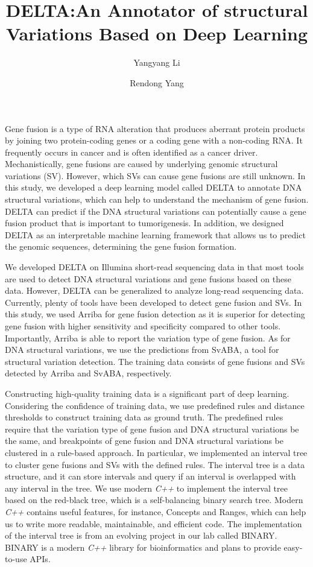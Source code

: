 \documentclass{article}
\title{DELTA:An Annotator of structural Variations Based on Deep Learning}
\author[1]{Yangyang Li}
\author[1]{Rendong Yang}
\affil[1]{\small Department of Urology, Northwestern University Feinberg School of Medicine, Chicago, IL 60611,
USA.}
\begin{document}
\maketitle



Gene fusion is a type of RNA alteration that produces aberrant protein products by joining two protein-coding genes or a coding gene with a non-coding RNA\@.
It frequently occurs in cancer and is often identified as a cancer driver.
Mechanistically, gene fusions are caused by underlying genomic structural variations (SV).
However, which SVs can cause gene fusions are still unknown.
In this study, we developed a deep learning model called DELTA to annotate DNA structural variations, which can help to understand the mechanism of gene fusion.
DELTA can predict if the DNA structural variations can potentially cause a gene fusion product that is important to tumorigenesis.
In addition, we designed DELTA as an interpretable machine learning framework that allows us to predict the genomic sequences, determining the gene fusion formation.


We developed DELTA on Illumina short-read sequencing data in that most tools are used to detect DNA structural variations and gene fusions based on these data.
However, DELTA can be generalized to analyze long-read sequencing data.
Currently, plenty of tools have been developed to detect gene fusion and SVs.
In this study, we used Arriba for gene fusion detection as it is superior for detecting gene fusion with higher sensitivity and specificity compared to other tools.
Importantly, Arriba is able to report the variation type of gene fusion.
As for DNA structural variations, we use the predictions from SvABA, a tool for structural variation detection.
The training data consists of gene fusions and SVs detected by Arriba and SvABA, respectively\@.

Constructing high-quality training data is a significant part of deep learning.
Considering the confidence of training data, we use predefined rules and distance thresholds to construct training data as ground truth.
The predefined rules require that the variation type of gene fusion and DNA structural variations be the same, and breakpoints of gene fusion and DNA structural variations be clustered in a rule-based approach.
In particular, we implemented an interval tree to cluster gene fusions and SVs with the defined rules.
The interval tree is a data structure, and it can store intervals and query if an interval is overlapped with any interval in the tree.
We use modern \textit{C++} to implement the interval tree based on the red-black tree, which is a self-balancing binary search tree.
Modern \textit{C++} contains useful features, for instance, Concepts and Ranges, which can help us to write more readable, maintainable, and efficient code.
The implementation of the interval tree is from an evolving project in our lab called BINARY\@.
BINARY is a modern \textit{C++} library for bioinformatics and plans to provide easy-to-use APIs\@.
\end{document}

